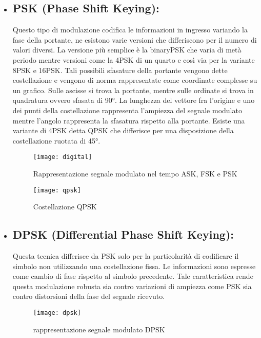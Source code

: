 \begin{itemize}
  \item \subsection{PSK (Phase Shift Keying): } Questo tipo di modulazione codifica le informazioni in ingresso variando la fase della portante, ne esistono varie versioni che differiscono per il numero di valori diversi. La versione più semplice è la binaryPSK che varia di metà periodo mentre versioni come la 4PSK di un quarto e così via per la variante 8PSK e 16PSK. Tali possibili sfasature della portante vengono dette costellazione e vengono di norma rappresentate come coordinate complesse su un grafico. Sulle ascisse si trova la portante, mentre sulle ordinate si trova in quadratura ovvero sfasata di 90°. La lunghezza del vettore fra l'origine e uno dei punti della costellazione rappresenta l'ampiezza del segnale modulato mentre l'angolo rappresenta la sfasatura rispetto alla portante. Esiste una variante di 4PSK detta QPSK che differisce per una disposizione della costellazione ruotata di 45°.
  \begin{figure}[h!]
  	\begin{minipage}[b]{.6\columnwidth}
  		\centering
  		\texttt{[image: digital]}
  		\caption{Rappresentazione segnale modulato nel tempo ASK, FSK e PSK \cite{digit}}\label{fig:1}
  	\end{minipage}\hfill
  	\begin{minipage}[b]{.35\columnwidth}
  		\texttt{[image: qpsk]}
  		\caption{Costellazione QPSK \cite{qpsk}}\label{fig:1}
  	\end{minipage}\hfill
  \end{figure}
  \item \subsection{DPSK (Differential Phase Shift Keying): } Questa tecnica differisce da PSK solo per la particolarità di codificare il simbolo non utilizzando una costellazione fissa. Le informazioni sono espresse come cambio di fase rispetto al simbolo precedente. Tale caratteristica rende questa modulazione robusta sia contro variazioni di ampiezza come PSK sia contro distorsioni della fase del segnale ricevuto.
  \begin{figure}[h]
  	\centering
  	\texttt{[image: dpsk]}
  	\caption{rappresentazione segnale modulato DPSK \cite{dpsk}}\label{fig:1}
  \end{figure}
    

\end{itemize}
